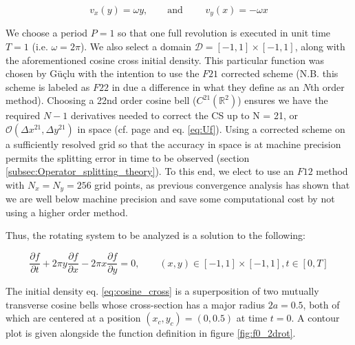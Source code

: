\documentclass[11pt,titlepage]{report}
\begin{document}
\begin{equation}v_x(y) = \omega y, \qquad \text{and } \qquad v_y(x) = -\omega x\end{equation}

\noindent We choose a period $P = 1$ so that one full revolution is executed in unit time $T = 1$ (i.e. $\omega = 2\pi$). We also select a domain $\mathcal{D}= [-1,1]\times [-1,1]$, along with the aforementioned cosine cross initial density. This particular function was chosen by G\"{u}\c{c}lu with the intention to use the $F21$ corrected scheme (N.B. this scheme is labeled as $F22$ in \cite{Guclu14} due a difference in what they define as an $N$th order method). Choosing a 22nd order cosine bell ($C^{21}(\mathbb{R}^2)$) ensures we have the required $N - 1$ derivatives needed to correct the CS up to N = 21, or $\mathcal{O}(\Delta x^{21}, \Delta y^{21})$ in space (cf. page \pageref{pg:deriv_reqs} and eq. \eqref{eq:Uf}). Using a corrected scheme on a sufficiently resolved grid so that the accuracy in space is at machine precision permits the splitting error in time to be observed (section \ref{subsec:Operator_splitting_theory}). To this end, we elect to use an $F12$ method with $N_x = N_y = 256$ grid points, as previous convergence analysis has shown that we are well below machine precision and save some computational cost by not using a higher order method. 

Thus, the rotating system to be analyzed is a solution to the following:

\begin{equation}
\frac{\partial f}{\partial t} + 2\pi y\frac{\partial f}{\partial x} - 2\pi x\frac{\partial f}{\partial y} =  0, \qquad (x,y)\in [-1,1]\times [-1,1], t\in [0,T] \label{eq:2Drot_advec_eq}
\end{equation}

\noindent The initial density eq. \eqref{eq:cosine_cross} is a superposition of two mutually transverse cosine bells whose cross-section has a major radius $2a = 0.5$, both of which are centered at a position $(x_c,y_c) = (0,0.5)$ at time $t = 0$. A contour plot is given alongside the function definition in figure \ref{fig:f0_2drot}.
\end{document}
